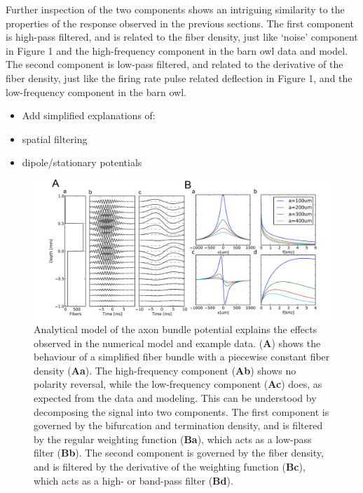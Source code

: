 \documentclass[]{article}
\providecommand{\tightlist}{%
  \setlength{\itemsep}{0pt}\setlength{\parskip}{0pt}}
\begin{document}
Further inspection of the two components shows an intriguing similarity
to the properties of the response observed in the previous sections. The
first component is high-pass filtered, and is related to the fiber
density, just like `noise' component in Figure 1 and the high-frequency
component in the barn owl data and model. The second component is
low-pass filtered, and related to the derivative of the fiber density,
just like the firing rate pulse related deflection in Figure 1, and the
low-frequency component in the barn owl.

\begin{itemize}
\tightlist
\item
  Add simplified explanations of:
\item
  spatial filtering
\item
  dipole/stationary potentials
\end{itemize}

\begin{figure}[htbp]
\centering
\includegraphics{../figs/mockups/fig5.pdf}
\caption{Analytical model of the axon bundle potential explains the
effects observed in the numerical model and example data. (\textbf{A})
shows the behaviour of a simplified fiber bundle with a piecewise
constant fiber density (\textbf{Aa}). The high-frequency component
(\textbf{Ab}) shows no polarity reversal, while the low-frequency
component (\textbf{Ac}) does, as expected from the data and modeling.
This can be understood by decomposing the signal into two components.
The first component is governed by the bifurcation and termination
density, and is filtered by the regular weighting function
(\textbf{Ba}), which acts as a low-pass filter (\textbf{Bb}). The second
component is governed by the fiber density, and is filtered by the
derivative of the weighting function (\textbf{Bc}), which acts as a
high- or band-pass filter (\textbf{Bd}).}
\end{figure}
\end{document}
